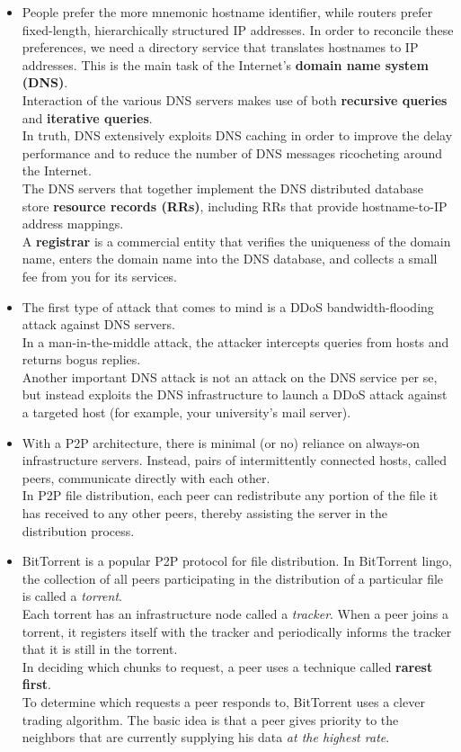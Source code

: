 \begin{itemize}
\item
People prefer the more mnemonic hostname identifier, while routers prefer fixed-length, hierarchically structured IP addresses. In order to reconcile these preferences, we need a directory service that translates hostnames to IP addresses. This is the main task of the Internet's \textbf{domain name system (DNS)}.\\
Interaction of the various DNS servers makes use of both \textbf{recursive queries} and \textbf{iterative queries}.\\
In truth, DNS extensively exploits DNS caching in order to improve the delay performance and to reduce the number of DNS messages ricocheting around the Internet.\\
The DNS servers that together implement the DNS distributed database store \textbf{resource records (RRs)}, including RRs that provide hostname-to-IP address mappings.\\
A \textbf{registrar} is a commercial entity that verifies the uniqueness of the domain name, enters the domain name into the DNS database, and collects a small fee from you for its services.

\item
The first type of attack that comes to mind is a DDoS bandwidth-flooding attack against DNS servers.\\
In a man-in-the-middle attack, the attacker intercepts queries from hosts and returns bogus replies.\\
Another important DNS attack is not an attack on the DNS service per se, but instead exploits the DNS infrastructure to launch a DDoS attack against a targeted host (for example, your university's mail server).

\item
With a P2P architecture, there is minimal (or no) reliance on always-on infrastructure servers. Instead, pairs of intermittently connected hosts, called peers, communicate directly with each other.\\In P2P file distribution, each peer can redistribute any portion of the file it has received to any other peers, thereby assisting the server in the distribution process.

\item
BitTorrent is a popular P2P protocol for file distribution. In BitTorrent lingo, the collection of all peers participating in the distribution of a particular file is called a \textit{torrent}.\\
Each torrent has an infrastructure node called a \textit{tracker}. When a peer joins a torrent, it registers itself with the tracker and periodically informs the tracker that it is still in the torrent.\\
In deciding which chunks to request, a peer uses a technique called \textbf{rarest first}.\\
To determine which requests a peer responds to, BitTorrent uses a clever trading algorithm. The basic idea is that a peer gives priority to the neighbors that are currently supplying his data \textit{at the highest rate}.


\end{itemize}
